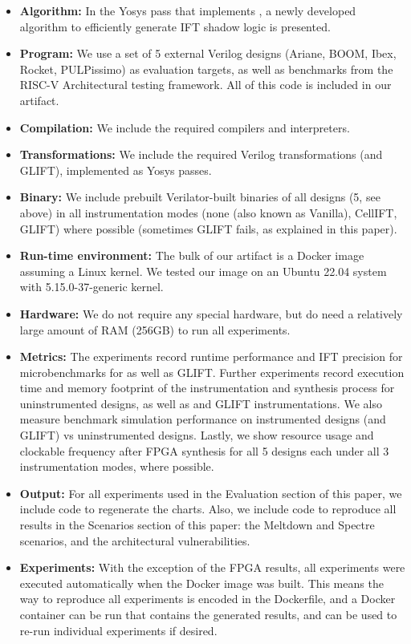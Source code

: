 \documentclass[letterpaper,twocolumn,10pt]{article}
\begin{document}
{\small
\begin{itemize}
  \item {\bf Algorithm: } In the Yosys pass that implements \ourname, a newly developed algorithm to efficiently generate IFT shadow logic is presented.
  \item {\bf Program: } We use a set of 5 external Verilog designs (Ariane, BOOM, Ibex, Rocket, PULPissimo) as evaluation targets, as well as benchmarks
      from the RISC-V Architectural testing framework. All of this code is included in our artifact.
  \item {\bf Compilation: } We include the required compilers and interpreters.
  \item {\bf Transformations: } We include the required Verilog transformations (\ourname and GLIFT), implemented as Yosys passes.
  \item {\bf Binary: } We include prebuilt Verilator-built binaries of all designs (5, see above) in all instrumentation modes (none (also known as Vanilla), CellIFT, GLIFT) where possible (sometimes GLIFT fails, as explained in this paper).
  \item {\bf Run-time environment: } The bulk of our artifact is a Docker image assuming a Linux kernel. We tested our image on an Ubuntu 22.04 system with 5.15.0-37-generic kernel.
  \item {\bf Hardware: } We do not require any special hardware, but do need a relatively large amount of RAM (256GB) to run all experiments.
  \item {\bf Metrics: } The experiments record runtime performance and IFT precision for microbenchmarks for \ourname as well as GLIFT. Further experiments record execution time and memory footprint of the instrumentation and synthesis process for uninstrumented designs, as well as \ourname and GLIFT instrumentations. We also measure benchmark simulation performance on instrumented designs (\ourname and GLIFT) vs uninstrumented designs. Lastly, we show resource usage and clockable frequency after FPGA synthesis for all 5 designs each under all 3 instrumentation modes, where possible.
  \item {\bf Output: } For all experiments used in the Evaluation section of this paper, we include code to regenerate the charts. Also, we include code to reproduce all results in the Scenarios section of this paper: the Meltdown and Spectre scenarios, and the architectural vulnerabilities. 
  \item {\bf Experiments: } With the exception of the FPGA results, all experiments were executed automatically when the Docker image was built. This means the way to reproduce all experiments is encoded in the Dockerfile, and a Docker container can be run that contains the generated results, and can be used to re-run individual experiments if desired. 

\end{itemize}}
\end{document}
